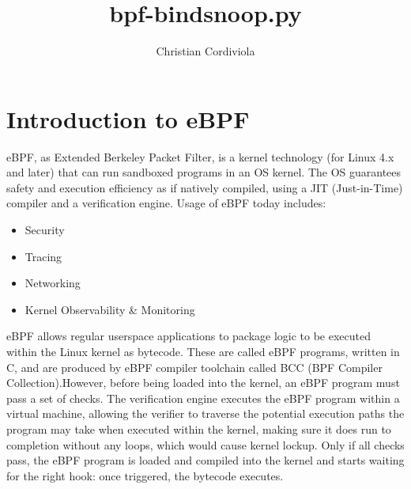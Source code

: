 \documentclass[12pt]{report}
\begin{document}
\title{bpf-bindsnoop.py}
\author{Christian Cordiviola}
\maketitle
\section*{Introduction to eBPF}
eBPF, as Extended Berkeley Packet Filter, is a kernel technology (for Linux 4.x and later) that can run sandboxed programs in an OS kernel. The OS guarantees safety and execution efficiency as if natively compiled, using a JIT (Just-in-Time) compiler and a verification engine.
	Usage of eBPF today includes:
	\begin{itemize}
		\item Security
		\item Tracing
		\item Networking
		\item Kernel Observability \& Monitoring
	\end{itemize}
eBPF allows regular userspace applications to package logic to be executed within the Linux kernel as bytecode. These are called eBPF programs, written in C, and are produced by eBPF compiler toolchain called BCC (BPF Compiler Collection).\newline However, before being loaded into the kernel, an eBPF program must pass a set of checks. The verification engine executes the eBPF program within a virtual machine, allowing the verifier to traverse the potential execution paths the program may take when executed within the kernel, making sure it does run to completion without any loops, which would cause kernel lockup. Only if all checks pass, the eBPF program is loaded and compiled into the kernel and starts waiting for the right hook: once triggered, the bytecode executes.
\end{document}
